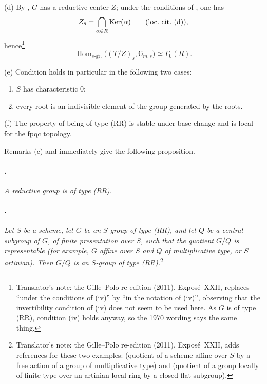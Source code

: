 \textup{(d)} By  \textup{},
\(G\) has a reductive center \(Z\); under the conditions of
\textup{}, one has
\[
  Z_{\bar s}
  =
  \bigcap_{\alpha\in R}\operatorname{Ker}(\alpha)
  \qquad\textup{(loc.\ cit.\ (d))},
\]
hence\footnote{Translator's note: the Gille--Polo re-edition (2011), Exposé~XXII, replaces
``under the conditions of (iv)'' by ``in the notation of (iv)'', observing that
the invertibility condition of (iv) does not seem to be used here. As \(G\) is
of type \textup{(RR)}, condition (iv) holds anyway, so the 1970 wording says the
same thing.}
\[
  \operatorname{Hom}_{\bar s\text{-gr.}}
    \bigl((T/Z)_{\bar s},\mathbb G_{m,\bar s}\bigr)
  \simeq
  \Gamma_0(R).
\]

\textup{(e)} Condition \textup{} holds in particular in the
following two cases:
\begin{enumerate}
\item[\textup{(1)}]
\(S\) has characteristic \(0\);

\item[\textup{(2)}]
every root is an indivisible element of the group generated by the
roots.
\end{enumerate}

\textup{(f)} The property of being of type \textup{(RR)} is stable
under base change and is local for the fpqc topology.

Remarks \textup{(c)} and \textup{} immediately give the
following proposition.

\paragraph{.}
\textit{A reductive group is of type \textup{(RR)}.}

\paragraph{.}
\textit{Let \(S\) be a scheme, let \(G\) be an \(S\)-group of type
\textup{(RR)}, and let \(Q\) be a central subgroup of \(G\), of
finite presentation over \(S\), such that the quotient \(G/Q\) is
representable \textup{(for example, \(G\) affine over \(S\) and
\(Q\) of multiplicative type, or \(S\) artinian)}. Then
\(G/Q\) is an \(S\)-group of type \textup{(RR)}.}\footnote{Translator's note: the Gille--Polo re-edition (2011), Exposé~XXII,
adds references for these two examples:  (quotient of a
scheme affine over \(S\) by a free action of a group of multiplicative type)
and  (quotient of a group locally of finite type over an
artinian local ring by a closed flat subgroup).}

